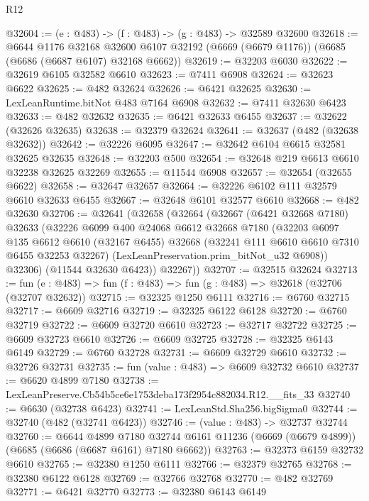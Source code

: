 \begin{lexlean}{R12}
\begin{coremodule}
@32604 := (e : @483) -> (f : @483) -> (g : @483) -> @32589 @32600
@32618 := @6644
    @1176
    @32168
    @32600
    @6107
    @32192
    (@6669 (@6679 @1176))
    (@6685 (@6686 (@6687 @6107) @32168 @6662))
@32619 := @32203 @6030
@32622 := @32619 @6105 @32582 @6610
@32623 := @7411 @6908
@32624 := @32623 @6622
@32625 := @482 @32624
@32626 := @6421 @32625
@32630 := LexLeanRuntime.bitNot @483 @7164 @6908
@32632 := @7411 @32630 @6423
@32633 := @482 @32632
@32635 := @6421 @32633 @6455
@32637 := @32622 (@32626 @32635)
@32638 := @32379 @32624
@32641 := @32637 (@482 (@32638 @32632))
@32642 := @32226 @6095
@32647 := @32642 @6104 @6615 @32581 @32625 @32635
@32648 := @32203 @500
@32654 := @32648 @219 @6613 @6610 @32238 @32625 @32269
@32655 := @11544 @6908
@32657 := @32654 (@32655 @6622)
@32658 := @32647 @32657
@32664 := @32226 @6102 @111 @32579 @6610 @32633 @6455
@32667 := @32648 @6101 @32577 @6610
@32668 := @482 @32630
@32706 := @32641
    (@32658
      (@32664
        (@32667
          (@6421 @32668 @7180)
          @32633
          (@32226
            @6099
            @400
            @24068
            @6612
            @32668
            @7180
            (@32203
              @6097
              @135
              @6612
              @6610
              (@32167 @6455)
              @32668
              (@32241 @111 @6610 @6610 @7310 @6455 @32253 @32267)
              (LexLeanPreservation.prim_bitNot_u32 @6908))
            @32306)
          (@11544 @32630 @6423))
        @32267))
@32707 := @32515 @32624
@32713 := fun (e : @483) => fun (f : @483) => fun (g : @483) => @32618 (@32706 (@32707 @32632))
@32715 := @32325 @1250 @6111
@32716 := @6760 @32715
@32717 := @6609 @32716
@32719 := @32325 @6122 @6128
@32720 := @6760 @32719
@32722 := @6609 @32720 @6610
@32723 := @32717 @32722
@32725 := @6609 @32723 @6610
@32726 := @6609 @32725
@32728 := @32325 @6143 @6149
@32729 := @6760 @32728
@32731 := @6609 @32729 @6610
@32732 := @32726 @32731
@32735 := fun (value : @483) => @6609 @32732 @6610
@32737 := @6620 @4899 @7180
@32738 := LexLeanPreserve.Cb54b5ce6e1753deba173f2954c882034.R12.__fits_33
@32740 := @6630 (@32738 @6423)
@32741 := LexLeanStd.Sha256.bigSigma0
@32744 := @32740 (@482 (@32741 @6423))
@32746 := (value : @483) -> @32737 @32744
@32760 := @6644
    @4899
    @7180
    @32744
    @6161
    @11236
    (@6669 (@6679 @4899))
    (@6685 (@6686 (@6687 @6161) @7180 @6662))
@32763 := @32373 @6159 @32732 @6610
@32765 := @32380 @1250 @6111
@32766 := @32379 @32765
@32768 := @32380 @6122 @6128
@32769 := @32766 @32768
@32770 := @482 @32769
@32771 := @6421 @32770
@32773 := @32380 @6143 @6149

\end{coremodule}
\end{lexlean}
